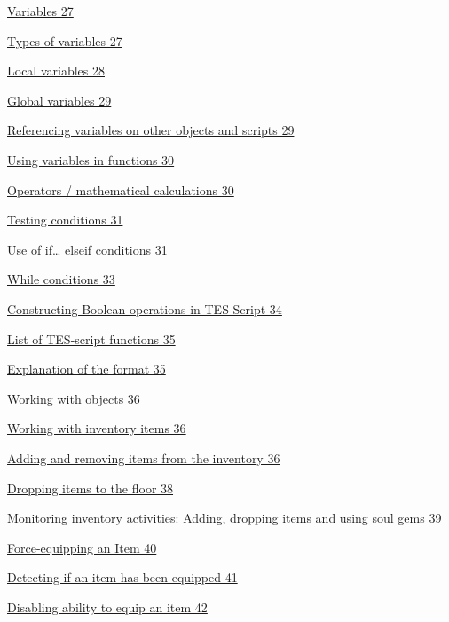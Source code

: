\documentclass[
]{article}
\begin{document}
\protect\hyperlink{variables}{Variables 27}

\protect\hyperlink{types-of-variables}{Types of variables 27}

\protect\hyperlink{_Toc182634499}{Local variables 28}

\protect\hyperlink{global-variables}{Global variables 29}

\protect\hyperlink{referencing-variables-on-other-objects-and-scripts}{Referencing
variables on other objects and scripts 29}

\protect\hyperlink{using-variables-in-functions}{Using variables in
functions 30}

\protect\hyperlink{section}{Operators / mathematical calculations 30}

\protect\hyperlink{_Toc182634504}{Testing conditions 31}

\protect\hyperlink{use-of-if-elseif-conditions}{Use of if\ldots{} elseif
conditions 31}

\protect\hyperlink{while-conditions}{While conditions 33}

\protect\hyperlink{constructing-boolean-operations-in-tes-script}{Constructing
Boolean operations in TES Script 34}

\protect\hyperlink{_Toc53412583}{List of TES-script functions 35}

\protect\hyperlink{explanation-of-the-format}{Explanation of the format
35}

\protect\hyperlink{working-with-objects}{Working with objects 36}

\protect\hyperlink{working-with-inventory-items}{Working with inventory
items 36}

\protect\hyperlink{adding-and-removing-items-from-the-inventory}{Adding
and removing items from the inventory 36}

\protect\hyperlink{dropping-items-to-the-floor}{Dropping items to the
floor 38}

\protect\hyperlink{monitoring-inventory-activities-adding-dropping-items-and-using-soul-gems}{Monitoring
inventory activities: Adding, dropping items and using soul gems 39}

\protect\hyperlink{force-equipping-an-item}{Force-equipping an Item 40}

\protect\hyperlink{detecting-if-an-item-has-been-equipped}{Detecting if
an item has been equipped 41}

\protect\hyperlink{disabling-ability-to-equip-an-item}{Disabling ability
to equip an item 42}
\end{document}
